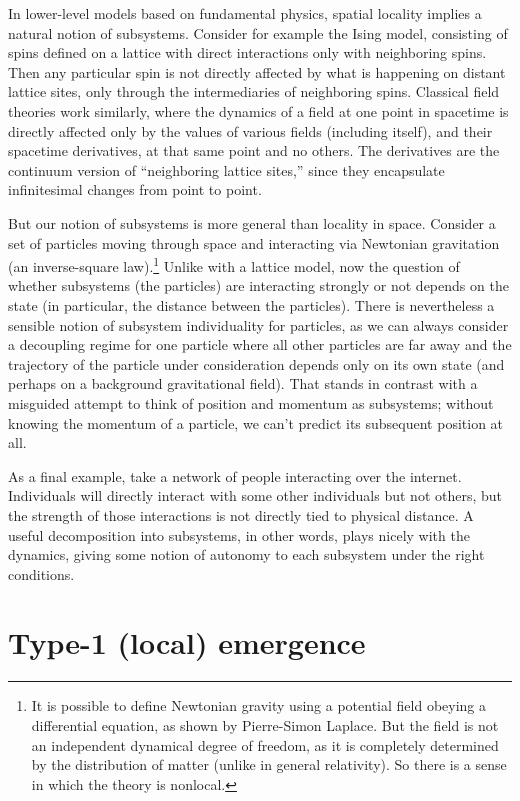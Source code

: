 \documentclass[12pt,english]{article}
\begin{document}
In lower-level models based on fundamental physics, spatial locality implies a natural notion of subsystems.
Consider for example the Ising model, consisting of spins defined on a lattice with direct interactions only with neighboring spins.
Then any particular spin is not directly affected by what is happening on distant lattice sites, only through the intermediaries of neighboring spins.
Classical field theories work similarly, where the dynamics of a field at one point in spacetime is directly affected only by the values of various fields (including itself), and their spacetime derivatives, at that same point and no others.
The derivatives are the continuum version of ``neighboring lattice sites,'' since they encapsulate infinitesimal changes from point to point.

But our notion of subsystems is more general than locality in space.
Consider a set of particles moving through space and interacting via Newtonian gravitation (an inverse-square law).\footnote{It is possible to define Newtonian gravity using a potential field obeying a differential equation, as shown by Pierre-Simon Laplace. But the field is not an independent dynamical degree of freedom, as it is completely determined by the distribution of matter (unlike in general relativity). So there is a sense in which the theory is nonlocal.}
Unlike with a lattice model, now the question of whether subsystems (the particles) are interacting strongly or not depends on the state (in particular, the distance between the particles).
There is nevertheless a sensible notion of subsystem individuality for particles, as we can always consider a decoupling regime for one particle where all other particles are far away and the trajectory of the particle under consideration depends only on its own state (and perhaps on a background gravitational field).
That stands in contrast with a misguided attempt to think of position and momentum as subsystems; without knowing the momentum of a particle, we can't predict its subsequent position at all. 

As a final example, take a network of people interacting over the internet.
Individuals will directly interact with some other individuals but not others, but the strength of those interactions is not directly tied to physical distance.
A useful decomposition into subsystems, in other words, plays nicely with the dynamics, giving some notion of autonomy to each subsystem under the right conditions.


\section*{Type-1 (local) emergence}
\end{document}
